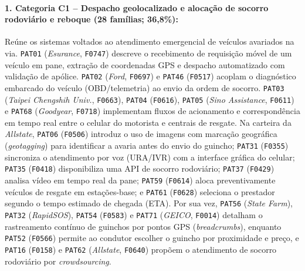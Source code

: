 \documentclass[12pt,a4paper]{article}
\begin{document}
\paragraph{1. Categoria C1 -- Despacho geolocalizado e alocação de socorro rodoviário e reboque (28 famílias; 36,8\%):}
Reúne os sistemas voltados ao atendimento emergencial de veículos avariados na via. \texttt{PAT01} (\textit{Esurance}, \texttt{F0747}) descreve o recebimento de requisição móvel de um veículo em pane, extração de coordenadas GPS e despacho automatizado com validação de apólice. \texttt{PAT02} (\textit{Ford}, \texttt{F0697}) e \texttt{PAT46} (\texttt{F0517}) acoplam o diagnóstico embarcado do veículo (OBD/telemetria) ao envio da ordem de socorro. \texttt{PAT03} (\textit{Taipei Chengshih Univ.}, \texttt{F0663}), \texttt{PAT04} (\texttt{F0616}), \texttt{PAT05} (\textit{Sino Assistance}, \texttt{F0611}) e \texttt{PAT68} (\textit{Goodyear}, \texttt{F0718}) implementam fluxos de acionamento e correspondência em tempo real entre o celular do motorista e centrais de resgate. Na carteira da \textit{Allstate}, \texttt{PAT06} (\texttt{F0506}) introduz o uso de imagens com marcação geográfica (\textit{geotagging}) para identificar a avaria antes do envio do guincho; \texttt{PAT31} (\texttt{F0355}) sincroniza o atendimento por voz (URA/IVR) com a interface gráfica do celular; \texttt{PAT35} (\texttt{F0418}) disponibiliza uma API de socorro rodoviário; \texttt{PAT37} (\texttt{F0429}) analisa vídeo em tempo real da pane; \texttt{PAT59} (\texttt{F0614}) aloca preventivamente veículos de resgate em estações-base; e \texttt{PAT61} (\texttt{F0628}) seleciona o prestador segundo o tempo estimado de chegada (ETA). Por sua vez, \texttt{PAT56} (\textit{State Farm}), \texttt{PAT32} (\textit{RapidSOS}), \texttt{PAT54} (\texttt{F0583}) e \texttt{PAT71} (\textit{GEICO}, \texttt{F0014}) detalham o rastreamento contínuo de guinchos por pontos GPS (\textit{breadcrumbs}), enquanto \texttt{PAT52} (\texttt{F0566}) permite ao condutor escolher o guincho por proximidade e preço, e \texttt{PAT16} (\texttt{F0158}) e \texttt{PAT62} (\textit{Allstate}, \texttt{F0640}) propõem o atendimento de socorro rodoviário por \textit{crowdsourcing}.
\end{document}
